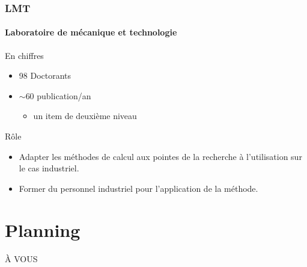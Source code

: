 \documentclass[12pt]{beamer}
\begin{document}
\begin{frame}

\frametitle{LMT}
\framesubtitle{Laboratoire de mécanique et technologie}

\begin{block}{En chiffres}
\begin{itemize}
  \item 98 Doctorants
  \item $\sim$60 publication/an
  \begin{itemize}
     \item un item de deuxième niveau
  \end{itemize}
\end{itemize}
\end{block}
\begin{block}{Rôle}
\begin{itemize}
  \item Adapter les méthodes de calcul aux pointes de la recherche à l'utilisation sur le cas industriel.
  \item Former du personnel industriel pour l'application de la méthode.
\end{itemize}
\end{block}
\end{frame}

\section{Planning}

À VOUS
\end{document}
